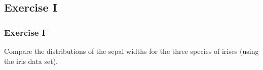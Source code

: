 


\subsection{Exercise I}
\begin{frame}
	\frametitle{Exercise I}
	Compare the distributions of the sepal widths for the three species of irises (using the \ttfamily iris \normalfont data set).
\end{frame}